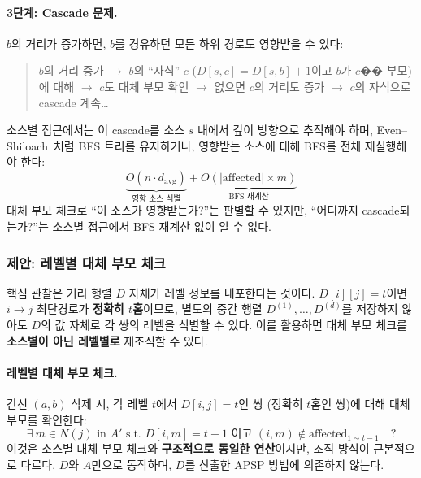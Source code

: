 \documentclass[11pt,a4paper]{article}
\begin{document}
\paragraph{3단계: Cascade 문제.}
$b$의 거리가 증가하면, $b$를 경유하던 모든 하위 경로도 영향받을 수 있다:
\begin{quote}
$b$의 거리 증가 $\to$ $b$의 ``자식'' $c$ ($D[s,c] = D[s,b]+1$이고 $b$가 $c$�� 부모)에 대해 $\to$ $c$도 대체 부모 확인 $\to$ 없으면 $c$의 거리도 증가 $\to$ $c$의 자식으로 cascade 계속\ldots
\end{quote}

소스별 접근에서는 이 cascade를 소스 $s$ 내에서 깊이 방향으로 추적해야 하며, Even--Shiloach~\cite{even1981}처럼 BFS 트리를 유지하거나, 영향받는 소스에 대해 BFS를 전체 재실행해야 한다:
\[
\underbrace{O(n \cdot d_{\text{avg}})}_{\text{영향 소스 식별}} + \underbrace{O(|\text{affected}| \times m)}_{\text{BFS 재계산}}
\]
대체 부모 체크로 ``이 소스가 영향받는가?''는 판별할 수 있지만, ``어디까지 cascade되는가?''는 소스별 접근에서 BFS 재계산 없이 알 수 없다.

\subsubsection{제안: 레벨별 대체 부모 체크}

핵심 관찰은 거리 행렬 $D$ 자체가 레벨 정보를 내포한다는 것이다. $D[i][j] = t$이면 $i \to j$ 최단경로가 \textbf{정확히 $t$홉}이므로, 별도의 중간 행렬 $D^{(1)}, \ldots, D^{(d)}$를 저장하지 않아도 $D$의 값 자체로 각 쌍의 레벨을 식별할 수 있다. 이를 활용하면 대체 부모 체크를 \textbf{소스별이 아닌 레벨별로} 재조직할 수 있다.

\paragraph{레벨별 대체 부모 체크.}
간선 $(a,b)$ 삭제 시, 각 레벨 $t$에서 $D[i,j] = t$인 쌍 (정확히 $t$홉인 쌍)에 대해 대체 부모를 확인한다:
\[
\exists\ m \in N(j) \text{ in } A' \text{ s.t. } D[i,m] = t-1 \text{ 이고 } (i,m) \notin \text{affected}_{1 \sim t-1} \quad ?
\]
이것은 소스별 대체 부모 체크와 \textbf{구조적으로 동일한 연산}이지만, 조직 방식이 근본적으로 다르다. $D$와 $A$만으로 동작하며, $D$를 산출한 APSP 방법에 의존하지 않는다.
\end{document}
